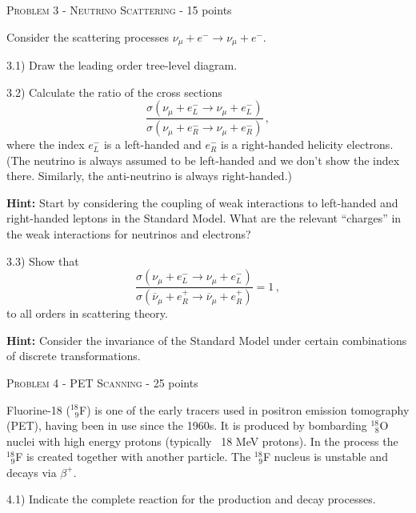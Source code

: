 \documentclass[a4paper,11pt]{report}
\begin{document}
\vspace{1cm}

{\large \textsc{Problem 3 - Neutrino Scattering} - 15 points}

Consider the scattering processes $\nu_\mu +e^- \to \nu_\mu +e^-$. 

3.1) Draw the leading order tree-level diagram.

3.2) Calculate the ratio of the cross sections
\begin{equation}
\frac{\sigma(\nu_\mu +e_L^- \to \nu_\mu +e_L^-)}{\sigma(\nu_\mu +e_R^- \to \nu_\mu +e_R^-)}\,,
\end{equation} 
where the index $e^-_L$ is a left-handed and $e^-_R$ is a right-handed helicity electrons. (The neutrino is always assumed to be left-handed and we don't show the index there. Similarly, the anti-neutrino is always right-handed.)

{\bf Hint:} Start by considering the coupling of weak interactions to left-handed and right-handed leptons in the Standard Model. What are the relevant ``charges'' in the weak interactions for neutrinos and electrons?

3.3) Show that 
\begin{equation}
\frac{\sigma(\nu_\mu +e_L^- \to \nu_\mu +e_L^-)}{\sigma(\overline\nu_\mu +e_R^+ \to \overline\nu_\mu +e_R^+)}=1\,,
\end{equation}
to all orders in scattering theory.

{\bf Hint:} Consider the invariance of the Standard Model under certain combinations of discrete transformations.

\vspace{1cm}

{\large \textsc{Problem 4 - PET Scanning} - 25 points}

Fluorine-18 ($^{18}_{\;\; 9}$F) is one of the early tracers used in positron emission tomography (PET), having been in use since the 1960s. It is produced by bombarding  $^{18}_{\;\; 8}$O nuclei with high energy protons (typically ~18 MeV protons). In the process the $^{18}_{\;\; 9}$F is created together with another particle. The $^{18}_{\;\; 9}$F nucleus is unstable and decays via $\beta^+$.

4.1) Indicate the complete reaction for the production and decay processes.
\end{document}
